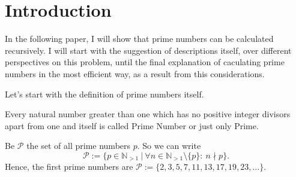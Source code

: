\chapter{Introduction}
\label{ch:introduction}
\minitoc
In the following paper, I will show that prime numbers can be calculated recursively. I will start with the suggestion of descriptions itself, over different perspectives on this problem, until the final explanation of caculating prime numbers in the most efficient way, as a result from this considerations.

\vspace{0.3cm}
Let's start with the definition of prime numbers itself.

\begin{definition}
	Every natural number greater than one which has no positive integer divisors apart from one and itself is called Prime Number or just only Prime.

	\vspace{0.3cm}
	Be $\mathcal{P}$ the set of all prime numbers $p$. So we can write
	\[ \mathcal{P} := \{ p \in \mathbb{N}_{> 1}\ | \ \forall n \in \mathbb{N}_{> 1} \setminus \{p\} : \ n \nmid p \} .\]
	Hence, the first prime numbers are $\mathcal{P} := \{2, 3, 5, 7, 11, 13, 17, 19, 23, \dots\}$.
\label{def:primenumbers}
\end{definition}


